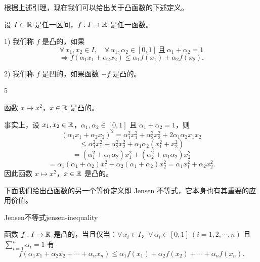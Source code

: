 根据上述引理，现在我们可以给出关于凸函数的下述定义。

\begin{mydef*}{}

	设 \(I\subset\mathbb{R}\) 是任一区间，\(f:I\to\mathbb{R}\) 是任一函数。

	1) 我们称 \(f\) 是凸的，如果
	\[
	\forall\,x_1,x_2\in I,\quad\forall\,\alpha_1,\alpha_2\in[0,1]\ \text{且}\ \alpha_1+\alpha_2=1
	\]
	\[
	\Longrightarrow f(\alpha_1x_1+\alpha_2x_2)\le\alpha_1f(x_1)+\alpha_2f(x_2).
	\]

	2) 我们称 \(f\) 是凹的，如果函数 \(-f\) 是凸的。

\end{mydef*}

\begin{sourceexample}{5}

	函数 \(x\longmapsto x^2\)，\(x\in\mathbb{R}\) 是凸的。

	事实上，设 \(x_1,x_2\in\mathbb{R}\)，\(\alpha_1,\alpha_2\in[0,1]\) 且 \(\alpha_1+\alpha_2=1\)，则
	\[
	(\alpha_1x_1+\alpha_2x_2)^2=\alpha_1^2x_1^2+\alpha_2^2x_2^2+2\alpha_1\alpha_2x_1x_2
	\]
	\[
	\le\alpha_1^2x_1^2+\alpha_2^2x_2^2+\alpha_1\alpha_2(x_1^2+x_2^2)
	\]
	\[
	=(\alpha_1^2+\alpha_1\alpha_2)x_1^2+(\alpha_2^2+\alpha_1\alpha_2)x_2^2
	\]
	\[
	=\alpha_1(\alpha_1+\alpha_2)x_1^2+\alpha_2(\alpha_1+\alpha_2)x_2^2=\alpha_1x_1^2+\alpha_2x_2^2.
	\]
	因此函数 \(x\longmapsto x^2\)，\(x\in\mathbb{R}\) 是凸的。

\end{sourceexample}

下面我们给出凸函数的另一个等价定义即 Jensen 不等式，它本身也有其重要的应用价值。

\begin{mythm}{Jensen不等式}{jensen-inequality}

	函数 \(f:I\to\mathbb{R}\) 是凸的，当且仅当：\(\forall\,x_i\in I\)，\(\forall\,\alpha_i\in[0,1]\ (i=1,2,\cdots,n)\) 且 \(\sum_{i=1}^n\alpha_i=1\) 有
	\[
	f(\alpha_1x_1+\alpha_2x_2+\cdots+\alpha_nx_n)\le\alpha_1f(x_1)+\alpha_2f(x_2)+\cdots+\alpha_nf(x_n). \tag{*}
	\]

\end{mythm}

